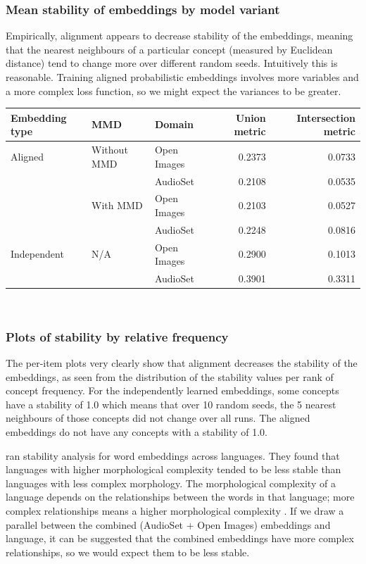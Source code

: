 \subsubsection{Mean stability of embeddings by model variant}

Empirically, alignment appears to decrease stability of the embeddings, meaning that the nearest neighbours of a particular concept (measured by Euclidean distance) tend to change more over different random seeds. Intuitively this is reasonable. Training aligned probabilistic embeddings involves more variables and a more complex loss function, so we might expect the variances to be greater. 

\begin{table}[H]
\centering
\begin{tabular}{lllrr}
\toprule
Embedding type  & MMD    & Domain          & Union metric & Intersection metric         \\
\midrule
Aligned & Without MMD   & Open Images &  0.2373 & 0.0733\\
            &     & AudioSet &  0.2108 & 0.0535\\
\cmidrule(lr){2-5}
            & With MMD & Open Images &  0.2103 & 0.0527\\
                   &     & AudioSet &  0.2248 & 0.0816\\
\cmidrule(lr){1-5}
Independent & N/A   & Open Images &  0.2900 & 0.1013 \\
                   &     & AudioSet &  0.3901 & 0.3311 \\
\bottomrule
\end{tabular}\\
\end{table}

\subsubsection{Plots of stability by relative frequency}

The per-item plots very clearly show that alignment decreases the stability of the embeddings, as seen from the distribution of the stability values per rank of concept frequency. For the independently learned embeddings, some concepts have a stability of 1.0 which means that over 10 random seeds, the 5 nearest neighbours of those concepts did not change over all runs. The aligned embeddings do not have any concepts with a stability of 1.0. 

\cite{WordEmbeddingStability} ran stability analysis for word embeddings across languages. They found that languages with higher morphological complexity tended to be less stable than languages with less complex morphology. The morphological complexity of a language depends on the relationships between the words in that language; more complex relationships means a higher morphological complexity \cite{MorphologicalComplexity}. If we draw a parallel between the combined (AudioSet + Open Images) embeddings and language, it can be suggested that the combined embeddings have more complex relationships, so we would expect them to be less stable. 


